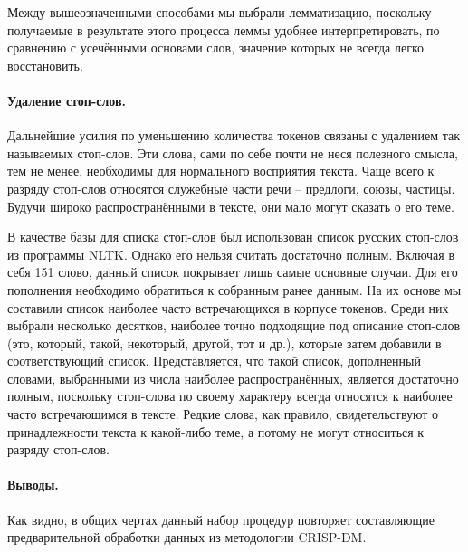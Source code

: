 Между вышеозначенными способами мы выбрали лемматизацию, поскольку получаемые в результате этого процесса леммы удобнее интерпретировать, по сравнению с усечёнными основами слов, значение которых не всегда легко восстановить.

\paragraph{Удаление стоп-слов.}
Дальнейшие усилия по уменьшению количества токенов связаны с удалением так называемых стоп-слов. Эти слова, сами по себе почти не неся полезного смысла, тем не менее, необходимы для нормального восприятия текста. Чаще всего к разряду стоп-слов относятся служебные части речи -- предлоги, союзы, частицы. Будучи широко распространёнными в тексте, они мало могут сказать о его теме.

В качестве базы для списка стоп-слов был использован список русских стоп-слов из программы NLTK. Однако его нельзя считать достаточно полным. Включая в себя 151 слово, данный список покрывает лишь самые основные случаи. Для его пополнения необходимо обратиться к собранным ранее данным. На их основе мы составили список наиболее часто встречающихся в корпусе токенов. Среди них выбрали несколько десятков, наиболее точно подходящие под описание стоп-слов (это, который, такой, некоторый, другой, тот и др.), которые затем добавили в соответствующий список. Представляется, что такой список, дополненный словами, выбранными из числа наиболее распространённых, является достаточно полным, поскольку стоп-слова по своему характеру всегда относятся к наиболее часто встречающимся в тексте. Редкие слова, как правило, свидетельствуют о принадлежности текста к какой-либо теме, а потому не могут относиться к разряду стоп-слов.


\paragraph{Выводы.}
Как видно, в общих чертах данный набор процедур повторяет составляющие предварительной обработки данных из методологии CRISP-DM.

